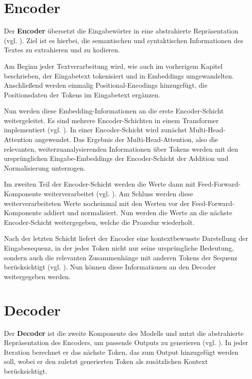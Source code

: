 \section{Encoder}

Der \textbf{Encoder} übersetzt die Eingabewörter in eine abstrahierte Repräsentation (vgl. \cite[S. 3]{attention}).  
Ziel ist es hierbei, die semantischen und syntaktischen Informationen des Textes zu extrahieren und zu kodieren.  

Am Beginn jeder Textverarbeitung wird, wie auch im vorherigem Kapitel beschrieben, der Eingabetext tokenisiert und in Embeddings umgewandelten.
Anschließend werden einmalig Positional-Encodings hinzugefügt, die Positionsdaten der Tokens im Eingabetext ergänzen.

Nun werden diese Embedding-Informationen an die erste Encoder-Schicht weitergeleitet.
Es sind mehrere Encoder-Schichten in einem Transformer implementiert (vgl. \cite[S. 3]{attention}). 
In einer Encoder-Schicht wird zunächst Multi-Head-Attention angewendet.
Das Ergebnis der Multi-Head-Attention, also die relevanten, weiterzuanalysierenden Informationen über Tokens werden mit den ursprünglichen Eingabe-Embeddings der Encoder-Schicht der Addition und Normalisierung unterzogen.

Im zweiten Teil der Encoder-Schicht werden die Werte dann mit Feed-Forward-Komponente weiterverarbeitet (vgl. \cite[S. 3]{attention}).
Am Schluss werden diese weiterverarbeiteten Werte nocheinmal mit den Werten vor der Feed-Forward-Komponente addiert und normalisiert. 
Nun werden die Werte an die nächste Encoder-Schicht weitergegeben, welche die Prozedur wiederholt.

Nach der letzten Schicht liefert der Encoder eine kontextbewusste Darstellung der Eingabesequenz, in der jedes Token nicht nur seine ursprüngliche Bedeutung, sondern auch die relevanten Zusammenhänge mit anderen Tokens der Sequenz berücksichtigt (vgl. \cite[S. 3]{attention}).
Nun können diese Informationen an den Decoder weitergegeben werden.

\section{Decoder}

Der \textbf{Decoder} ist die zweite Komponente des Modells und nutzt die abstrahierte Repräsentation des Encoders, um passende Outputs zu generieren (vgl. \cite[S. 3]{attention}). 
In jeder Iteration berechnet er das nächste Token, das zum Output hinzugefügt werden soll, wobei er den zuletzt generierten Token als zusätzlichen Kontext berücksichtigt.

